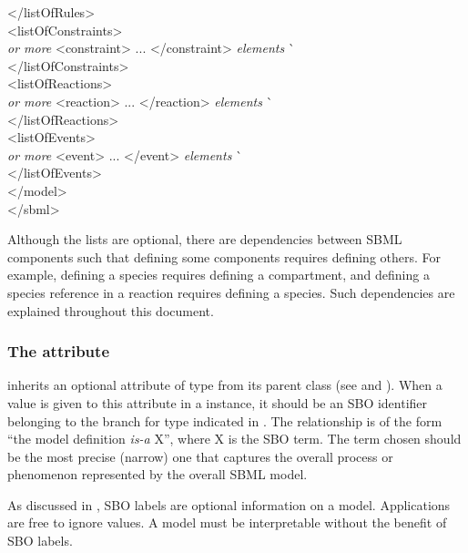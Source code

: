 \begin{minipage}{\linewidth}
\begin{tt}
\begin{tabbing}
\>\></listOfRules>\\
\>\><listOfConstraints>\\
\>\>\>\textrm{\emph{ or more}} <constraint> ... </constraint> \textrm{\emph{elements}}  \` \sayOptional\\
\>\></listOfConstraints>\\
\>\><listOfReactions>\\
\>\>\>\textrm{\emph{ or more}} <reaction> ... </reaction> \textrm{\emph{elements}}  \` \sayOptional\\
\>\></listOfReactions>\\
\>\><listOfEvents>\\
\>\>\>\textrm{\emph{ or more}} <event> ... </event> \textrm{\emph{elements}}  \` \sayOptional\\
\>\></listOfEvents>\\
\></model>\\
</sbml>
\end{tabbing}
\regularspacing
\end{tt}
\end{minipage}

Although the lists are optional, there are dependencies between
SBML components such that defining some components requires
defining others.  For example, defining a species requires
defining a compartment, and defining a species reference in a reaction requires defining
a species.  Such dependencies are explained throughout this
document.
  

\subsubsection{The  attribute}
\label{sec:model-sboterm}

\Model inherits an optional  attribute of type
 from its parent class \SBase (see
 and ).  When a
value is given to this attribute in a \Model instance, it should
be an SBO identifier belonging to the branch for type \Model
indicated in .  The
  relationship is of the form ``the model definition \emph{is-a}
  X'', where X is the SBO term.  The term chosen should be the
most precise (narrow) one that captures the overall process or
phenomenon represented by the overall SBML model.

As discussed in , SBO labels are optional
information on a model.  Applications are free to ignore
 values.  A model must be interpretable without the
benefit of SBO labels.


